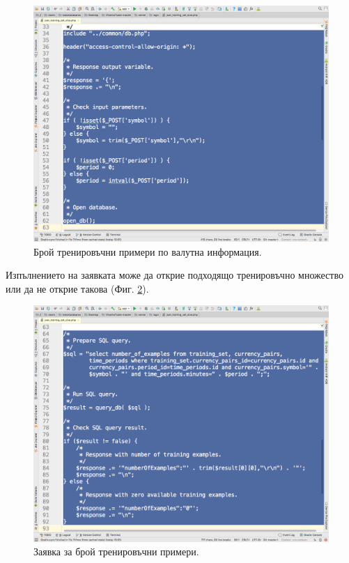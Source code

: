\documentclass[book,14pt,oneside,openany]{memoir}
\begin{document}
\begin{figure}[h]
  \centering
  \includegraphics[height=0.45\pdfpageheight]{pic0139}
  \caption{Брой тренировъчни примери по валутна информация.}
\label{fig:pic0139}
\end{figure}
\FloatBarrier

Изпълнението на заявката може да открие подходящо тренировъчно множество или да не открие такова (Фиг. \ref{fig:pic0140}). 

\begin{figure}[h]
  \centering
  \includegraphics[height=0.45\pdfpageheight]{pic0140}
  \caption{Заявка за брой тренировъчни примери.}
\label{fig:pic0140}
\end{figure}
\FloatBarrier
\end{document}
